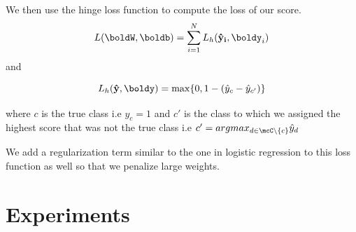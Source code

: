 \documentclass[11pt]{article}
\begin{document}
\begin{itemize}
  We then use the hinge loss function to compute the loss of our score.
  $$ L(\boldW, \boldb) = \sum_{i=1}^{N} L_{h}(\bold{\hat{y}_i},\boldy_i) $$
  and

  $$ L_h(\bold{\hat{y}},\boldy) = \max \{0,1 - (\hat{y}_c - \hat{y}_{c'}) \}$$

  where $c$ is the true class i.e $y_c = 1$ and $c'$ is the class to which
  we assigned the highest score that was not the true class i.e
  $c' = argmax_{d \in \mcC \setminus \{c\}} \hat{y}_d$

  We add a regularization term similar to the one in logistic regression to this
  loss function as well so that we penalize large weights.

\end{itemize}

\section{Experiments}
\end{document}
